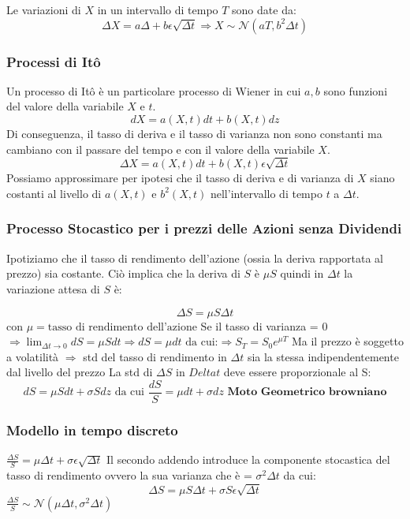 \documentclass[12pt,a4paper]{report}
\begin{document}
Le variazioni di \( X \) in un intervallo di tempo \( T \) sono date da:
\[
\Delta X = a\Delta + b \epsilon \sqrt{\Delta t} \Longrightarrow X \sim \mathcal{N}( aT, b^2 \Delta t)
\]

\newpage
\subsubsection{Processi di Itô}
Un processo di Itô è un particolare processo di Wiener in cui \( a, b \) sono funzioni del valore della variabile \( X \) e \( t \).
\[
dX = a(X, t)dt + b(X, t)dz
\]
Di conseguenza, il tasso di deriva e il tasso di varianza non sono constanti ma cambiano con il passare del tempo e con il valore della variabile \( X \).
\[
\Delta X = a(X, t)dt + b(X, t) \epsilon \sqrt{\Delta t}
\]
Possiamo approssimare per ipotesi che il tasso di deriva e di varianza di \(X\) siano costanti al livello di \(a(X, t)\) e \(b^2(X, t)\) nell'intervallo di tempo \(t\) a \(\Delta t\).
\subsubsection{Processo Stocastico per i prezzi delle Azioni senza Dividendi}
Ipotiziamo che il tasso di rendimento dell'azione (ossia la deriva rapportata al prezzo) sia costante.
\newline
Ciò implica che la deriva di \(S\) è \(\mu S\) quindi in \(\Delta t\) la variazione attesa di \(S\) è: 

\[
\Delta S = \mu S \Delta t
\]
con \(\mu = \text{tasso di rendimento dell'azione}\)
\newline
Se il tasso di varianza = 0
\newline
\(\Longrightarrow\lim_{\Delta t \to 0} dS = \mu S dt \Longrightarrow dS = \mu dt \text{ da cui:} \Longrightarrow S_T = S_0e^{\mu T}\)
Ma il prezzo è soggetto a volatilità \(\Longrightarrow\) std del tasso di rendimento in \(\Delta t\) sia la stessa indipendentemente dal livello del prezzo
\newline
La std di \(\Delta S\) in \(Delta t\) deve essere proporzionale al S:
\[
dS = \mu S dt + \sigma S dz \text{ da cui } \frac{dS}{S} = \mu dt + \sigma dz \textbf{ Moto Geometrico browniano}
\]
\newpage
\subsubsection{Modello in tempo discreto}
\(\frac{\Delta S}{S} = \mu \Delta t + \sigma \epsilon \sqrt{\Delta t}\)
Il secondo addendo introduce la componente stocastica del tasso di rendimento ovvero la sua varianza che è = \(\sigma^2 \Delta t\)
da cui:
\[
\Delta S = \mu S \Delta t + \sigma S \epsilon \sqrt{\Delta t}
\]
\(\frac{\Delta S}{S} \sim \mathcal{N}(\mu \Delta t, \sigma^2 \Delta t)\)
\end{document}
